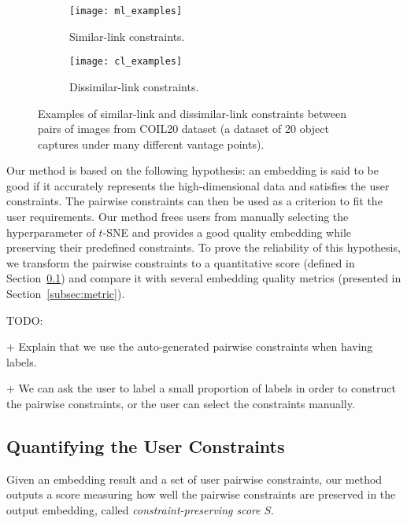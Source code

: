 \begin{figure}
    \centering
    \begin{subfigure}[c]{0.48\linewidth}
        \texttt{[image: ml\_examples]}
        \caption{Similar-link constraints.}
    \end{subfigure}
    \begin{subfigure}[c]{0.48\linewidth}
        \texttt{[image: cl\_examples]}
        \caption{Dissimilar-link constraints.}
    \end{subfigure}
    \caption{Examples of similar-link and dissimilar-link constraints between pairs of images from COIL20 dataset (a dataset of 20 object captures under many different vantage points).}
    \label{fig:ml_cl_examples}
\end{figure}

Our method is based on the following hypothesis: an embedding is said to be good if it accurately represents the high-dimensional data and satisfies the user constraints. The pairwise constraints can then be used as a criterion to fit the user requirements.
Our method frees users from manually selecting the hyperparameter of $t$-SNE and provides a good quality embedding while preserving their predefined constraints.
To prove the reliability of this hypothesis, we transform the pairwise constraints to a quantitative score (defined in Section~\ref{subsec:s_score}) and compare it with several embedding quality metrics (presented in Section~\ref{subsec:metric}).

TODO:

+ Explain that  we use the auto-generated pairwise constraints when having labels.

+ We can ask the user to label a small proportion of labels in order to construct the pairwise constraints, or the user can select the constraints manually.


\subsection{Quantifying the User Constraints}\label{subsec:s_score}
Given an embedding result and a set of user pairwise constraints, our method outputs a score measuring how well the pairwise constraints are preserved in the output embedding, called \emph{constraint-preserving score} $S$.


